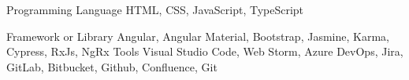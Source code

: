 

\begin{cvskills}

  \cvskill
    {Programming Language} %
    {HTML, CSS, JavaScript, TypeScript} %

  \cvskill
    {Framework or Library} %
    {Angular, Angular Material, Bootstrap, Jasmine, Karma, Cypress, RxJs, NgRx} %
  \cvskill
    {Tools} %
    {Visual Studio Code, Web Storm, Azure DevOps, Jira, GitLab, Bitbucket, Github, Confluence, Git} %

\end{cvskills}
